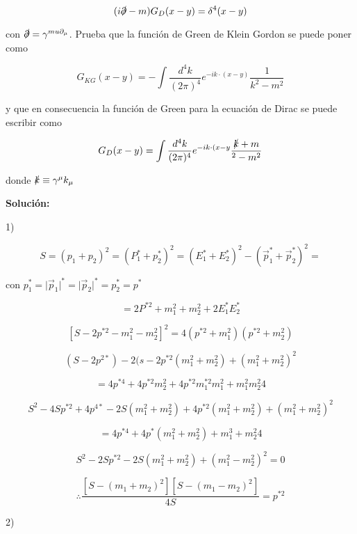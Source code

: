\documentclass{report}
\begin{document}
\begin{itemize}
{{\begin{equation}
(i \slashed{\partial}-m)G_{D} (x-y) = \delta ^4 (x-y)
\end{equation}

con $\slashed{\partial} =\gamma^{mu\partial_{\mu}}$. Prueba que la función de Green de Klein Gordon se puede poner como

\begin{equation}
G_{KG}(x-y) = -\int \frac{d^4 k }{(2 \pi )^4 } e^{-ik\cdot (x-y)} \frac{1}{k^2 -m^2 }
\end{equation}

y que en consecuencia la función de Green para la ecuación de Dirac se puede escribir como

\begin{equation}
G_{D}(x-y) =\int \frac{d^4 k}{(2 \pi) ^4} e^{-ik \cdot (x-y} \frac{\slashed{k} + m}{^2 - m^2}
\end{equation}

donde $\slashed{k} \equiv \gamma^{\mu} k_{\mu}$

\textbf{Solución:}

\item 1) 

\[S = (p_1 + p_2 )^2 = (P_{1} ^{*} + p_{2}^{*})^2 = (E_{1}^{*} + E_{2}^{*})^2 - (\vec{p}_{1}^{*}+\vec{p}_{2}^{*})^2 = \] 

con $p_{1}^{*}=\vert \vec{p}_{1}\vert ^{*} = \vert \vec{p}_{2} \vert ^{*} = p_{2}^{*} = p^{*}$

\[= 2 P^{* 2} + m_{1}^{2} + m_{2}^{2} + 2 E_{1}^{*} E_{2}^{*}\] 

\[[S-2p^{*2} - m_{1}^{2} - m_{2}^{2}]^{2} =4 (p^{*2}+m_{1}^{2})(p^{*2} +m_{2}^{2})\] 

\[(S-2p^{2*}) - 2 (s-2 p^{*2} (m_{1}^{2} + m^{2}_{2}) +(m_{1}^{2} + m_{2}^{2})^{2}\] 

\[= 4 p^{*4} + 4p^{*2} m_{2}^{2} + 4 p^{*2}m_{1}^{*2}m_{1}^{2} + m_{1}^{2} m_{2}^{2} 4\] 

\[S^{2} -4S p^{* 2 } + 4 p^{4*} - 2S (m_{1}^{2} +  m_{2}^{2}) + 4 p^{*2}  (m_{1}^{2} + m_{2}^{2}) + (m_{1}^{2} + m_{2}^{2})^{2} \] 

\[= 4 p^{*4} + 4 p^{*} (m_{1}^{2} + m_{2}^{2}) + m_{1}^{3} + m_{2}^{2} 4 \] 

\[S^2 - 2S p^{*2} - 2S (m_{1}^{2} + m_{2}^{2}) + (m_{1}^{2} - m_{2}^{2})^2 = 0 \] 

\[\therefore  \frac{[S- (m_1 + m_2 )^2 ] [S-(m_1 - m_2 )^2 ]}{4S} = p^{*2} \] 

\item 2) 

}}
\end{itemize}
\end{document}
